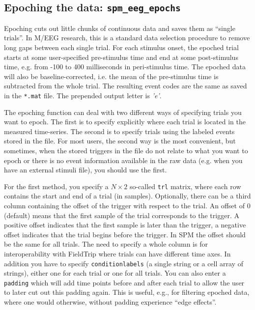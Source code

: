 \subsection{Epoching the data: \texttt{spm\_eeg\_epochs}}
Epoching cuts out little chunks of continuous data and saves them as ``single trials''. In M/EEG research, this is a standard data selection procedure to remove long gaps between each single trial. For each stimulus onset, the epoched trial starts at some user-specified pre-stimulus time and end at some post-stimulus time, e.g. from -100 to 400 milliseconds in peri-stimulus time. The epoched data will also be baseline-corrected, i.e. the mean of the pre-stimulus time is subtracted from the whole trial. The resulting event codes are the same as saved in the \texttt{*.mat} file. The prepended output letter is \textit{'e'}.

The epoching function can deal with two different ways of specifying trials you want to epoch. The first is to specify explicitly where each trial is located in the measured time-series. The second is to specify trials using the labeled events stored in the file. For most users, the second way is the most convenient, but sometimes, when the stored triggers in the file do not relate to what you want to epoch or there is no event information available in the raw data (e.g. when you have an external stimuli file), you should use the first.

For the first method, you specify a $N \times 2$ so-called \texttt{trl} matrix, where each row contains the start and end of a trial (in samples). Optionally, there can be a third column containing the offset of the trigger with respect to the trial. An offset of 0 (default) means that the first sample of the trial corresponds to the trigger. A positive offset indicates that the first sample is later than the trigger, a negative offset indicates that the trial begins before the trigger. In SPM the offset should be the same for all trials. The need to specify a whole column is for interoperability with FieldTrip where trials can have different time axes. In addition you have to specify \texttt{conditionlabels} (a single string or a cell array of strings), either one for each trial or one for all trials. You can also enter a \texttt{padding} which will add time points before and after each trial to allow the user to later cut out this padding again. This is useful, e.g., for filtering epoched data, where one would otherwise, without padding experience ``edge effects''.

